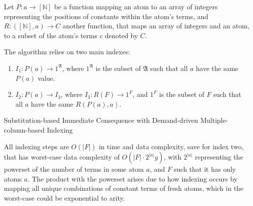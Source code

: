\documentclass[sigconf,screen,review=false,natbib]{acmart}
\theoremstyle{definition}
\begin{document}
Let $P : a \to [\mathbb{N}]$ be a function mapping an atom to an array of integers representing the positions of constants within the atom's terms, and
$R : ([\mathbb{N}], a) \to C$ another function, that maps an array of integers and an atom, to a subset of the atom's terms $c$ denoted by $C$.

The algorithm relies on two main indexes:
\begin{enumerate}
	\item $I_1 : P(a) \to 1^{\mathfrak{A}}$, where $1^{\mathfrak{A}}$ is the subset of
	      $\mathfrak{A}$ such that all $a$ have the same $P(a)$ value.
	\item $I_2 : P(a) \to I_3$, where $I_3 : R(F) \to 1^{F}$, and $1^{F}$ is the subset
	      of $F$ such that all $a$ have the same $R(P(a), a)$.
\end{enumerate}
\begin{algorithm}
	\SetAlgoLined
	\caption{Substitution-based Immediate Consequence with Demand-driven Multiple-column-based Indexing}
\end{algorithm}
All indexing steps are $O(|F|)$ in time and data complexity, save for index two, that has worst-case data complexity of $O(|F| \cdot 2^{|a|}y)$, with $2^{|a|}$
representing the powerset of the number of terms in some atom $a$, and $F$ such that it has only atoms $a$. The product with the powerset arises due to how
indexing occurs by mapping all unique combinations of constant terms of fresh atoms, which in the worst-case could be exponential to arity.
\end{document}
